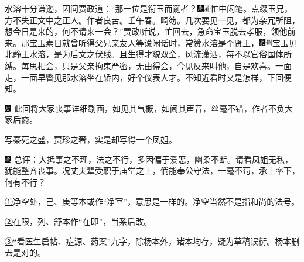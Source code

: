 水溶十分谦逊，因问贾政道：``那一位是衔玉而诞者？{\includegraphics[width=3mm]{../Images/00004}\includegraphics[width=3mm]{../Images/00010}\footnotesize \kaishu 忙中闲笔。点缀玉兄，方不失正文中之正人。作者良苦。壬午春。畸笏。}几次要见一见，都为杂冗所阻，想今日是来的，何不请来一会？''贾政听说，忙回去，急命宝玉脱去孝服，领他前来。那宝玉素日就曾听得父兄亲友人等说闲话时，常赞水溶是个贤王，{\includegraphics[width=3mm]{../Images/00006}\includegraphics[width=3mm]{../Images/00011}\footnotesize \kaishu 宝玉见北静王水溶，是为后文之伏线。}且生得才貌双全，风流潇洒，每不以官俗国体所缚。每思相会，只是父亲拘束严密，无由得会，今见反来叫他，自是欢喜。一面走，一面早瞥见那水溶坐在轿内，好个仪表人才。不知近看时又是怎样，下回便知。

{{\includegraphics[width=3mm]{../Images/00004}  \kaishu 此回将大家丧事详细剔画，如见其气概，如闻其声音，丝毫不错，作者不负大家后裔。}}

{{写秦死之盛，贾珍之奢，实是却写得一个凤姐。}}

{\includegraphics[width=3mm]{../Images/00005} \kaishu 总评：大抵事之不理，法之不行，多因偏于爱恶，幽柔不断。请看凤姐无私，犹能整齐丧事。况丈夫辈受职于庙堂之上，倘能奉公守法，一毫不苟，承上率下，何有不行？}

{\href{../Text/part0018_split_000.html\#navto_1_a}{①}净空处，己、庚等本或作``净室''，意思是一样的。净空当然不是指和尚的法号。}

{\href{../Text/part0018_split_000.html\#navto_2_a}{②}在限，列、舒本作``在即''，当系后改。}

{\href{../Text/part0018_split_000.html\#navto_3_a}{③}``看医生启帖、症源、药案''九字，除杨本外，诸本均存，疑为草稿误衍。杨本删去是对的。}

